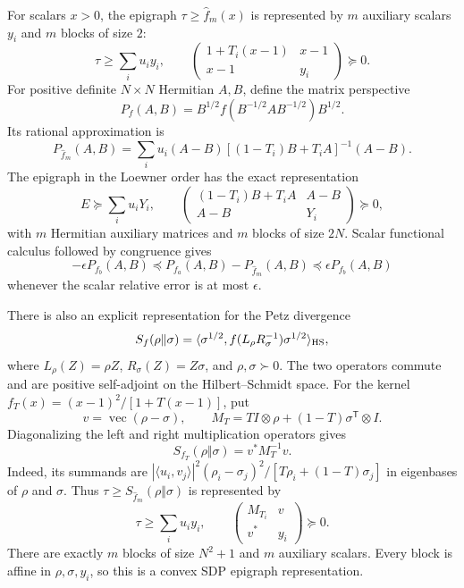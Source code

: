 \documentclass[11pt]{article}
\numberwithin{equation}{section}
\newcommand{\vecop}{\operatorname{vec}}
\begin{document}
For scalars $x>0$, the epigraph $\tau\ge\widehat f_m(x)$ is represented
by $m$ auxiliary scalars $y_i$ and $m$ blocks of size $2$:
\begin{equation}\label{eq:scalarSDP}
 \tau\ge\sum_i u_i y_i,\qquad
 \begin{pmatrix}1+T_i(x-1)&x-1\\x-1&y_i\end{pmatrix}\succeq0.
\end{equation}
For positive definite $N\times N$ Hermitian $A,B$, define the matrix
perspective
\[
 P_f(A,B)=B^{1/2}f(B^{-1/2}AB^{-1/2})B^{1/2}.
\]
Its rational approximation is
\[
 P_{\widehat f_m}(A,B)=\sum_i u_i(A-B)
                      [(1-T_i)B+T_iA]^{-1}(A-B).
\]
The epigraph in the Loewner order has the exact representation
\begin{equation}\label{eq:matrixSDP}
 E\succeq\sum_i u_iY_i,\qquad
 \begin{pmatrix}(1-T_i)B+T_iA&A-B\\ A-B&Y_i\end{pmatrix}\succeq0,
\end{equation}
with $m$ Hermitian auxiliary matrices and $m$ blocks of size $2N$.
Scalar functional calculus followed by congruence gives
\begin{equation}\label{eq:matrixError}
 -\epsilon P_{f_b}(A,B)\preceq P_{f_a}(A,B)-P_{\widehat f_m}(A,B)
                          \preceq\epsilon P_{f_b}(A,B)
\end{equation}
whenever the scalar relative error is at most $\epsilon$.

There is also an explicit representation for the Petz divergence
\[
 S_f(\rho\Vert\sigma)=
  \langle\sigma^{1/2},f(L_\rho R_\sigma^{-1})\sigma^{1/2}\rangle_{\rm HS},
\]
where $L_\rho(Z)=\rho Z$, $R_\sigma(Z)=Z\sigma$, and
$\rho,\sigma\succ0$. The two operators commute and are positive
self-adjoint on the Hilbert--Schmidt space.
For the kernel $f_T(x)=(x-1)^2/[1+T(x-1)]$, put
\[
 v=\vecop(\rho-\sigma),\qquad
 M_T=T I\otimes\rho+(1-T)\sigma^{\mathsf T}\otimes I.
\]
Diagonalizing the left and right multiplication operators gives
\begin{equation}\label{eq:PetzKernel}
 S_{f_T}(\rho\Vert\sigma)=v^*M_T^{-1}v.
\end{equation}
Indeed, its summands are
$|\langle u_i,v_j\rangle|^2(\rho_i-\sigma_j)^2/
[T\rho_i+(1-T)\sigma_j]$ in eigenbases of $\rho$ and $\sigma$.
Thus $\tau\ge S_{\widehat f_m}(\rho\Vert\sigma)$ is represented by
\begin{equation}\label{eq:PetzSDP}
 \tau\ge\sum_i u_i y_i,\qquad
 \begin{pmatrix}M_{T_i}&v\\v^*&y_i\end{pmatrix}\succeq0.
\end{equation}
There are exactly $m$ blocks of size $N^2+1$ and $m$ auxiliary scalars.
Every block is affine in $\rho,\sigma,y_i$, so this is a convex SDP
epigraph representation.
\end{document}
